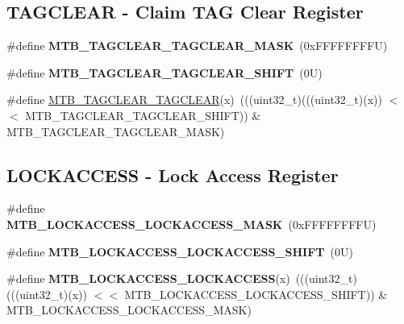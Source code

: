 \subsection*{T\+A\+G\+C\+L\+E\+AR -\/ Claim T\+AG Clear Register}
\begin{DoxyCompactItemize}
\item 
\mbox{\label{group___m_t_b___register___masks_ga50dabf07ab4f88615242b68c0466aab0}} 
\#define {\bfseries M\+T\+B\+\_\+\+T\+A\+G\+C\+L\+E\+A\+R\+\_\+\+T\+A\+G\+C\+L\+E\+A\+R\+\_\+\+M\+A\+SK}~(0x\+F\+F\+F\+F\+F\+F\+F\+F\+U)
\item 
\mbox{\label{group___m_t_b___register___masks_gac1ba97e3448e183a4d00b63060786290}} 
\#define {\bfseries M\+T\+B\+\_\+\+T\+A\+G\+C\+L\+E\+A\+R\+\_\+\+T\+A\+G\+C\+L\+E\+A\+R\+\_\+\+S\+H\+I\+FT}~(0\+U)
\item 
\#define \mbox{\hyperlink{group___m_t_b___register___masks_ga2a3e47e7cacd4d3812c5371fd6d3fa0b}{M\+T\+B\+\_\+\+T\+A\+G\+C\+L\+E\+A\+R\+\_\+\+T\+A\+G\+C\+L\+E\+AR}}(x)~(((uint32\+\_\+t)(((uint32\+\_\+t)(x)) $<$$<$ M\+T\+B\+\_\+\+T\+A\+G\+C\+L\+E\+A\+R\+\_\+\+T\+A\+G\+C\+L\+E\+A\+R\+\_\+\+S\+H\+I\+FT)) \& M\+T\+B\+\_\+\+T\+A\+G\+C\+L\+E\+A\+R\+\_\+\+T\+A\+G\+C\+L\+E\+A\+R\+\_\+\+M\+A\+SK)
\end{DoxyCompactItemize}
\subsection*{L\+O\+C\+K\+A\+C\+C\+E\+SS -\/ Lock Access Register}
\begin{DoxyCompactItemize}
\item 
\mbox{\label{group___m_t_b___register___masks_ga44e6720b612450d08ba896ca1ad61185}} 
\#define {\bfseries M\+T\+B\+\_\+\+L\+O\+C\+K\+A\+C\+C\+E\+S\+S\+\_\+\+L\+O\+C\+K\+A\+C\+C\+E\+S\+S\+\_\+\+M\+A\+SK}~(0x\+F\+F\+F\+F\+F\+F\+F\+F\+U)
\item 
\mbox{\label{group___m_t_b___register___masks_ga7417a26e29a0d9667c59ce74044f210b}} 
\#define {\bfseries M\+T\+B\+\_\+\+L\+O\+C\+K\+A\+C\+C\+E\+S\+S\+\_\+\+L\+O\+C\+K\+A\+C\+C\+E\+S\+S\+\_\+\+S\+H\+I\+FT}~(0\+U)
\item 
\mbox{\label{group___m_t_b___register___masks_ga02368a1bc86c6a5cbc793233ee314147}} 
\#define {\bfseries M\+T\+B\+\_\+\+L\+O\+C\+K\+A\+C\+C\+E\+S\+S\+\_\+\+L\+O\+C\+K\+A\+C\+C\+E\+SS}(x)~(((uint32\+\_\+t)(((uint32\+\_\+t)(x)) $<$$<$ M\+T\+B\+\_\+\+L\+O\+C\+K\+A\+C\+C\+E\+S\+S\+\_\+\+L\+O\+C\+K\+A\+C\+C\+E\+S\+S\+\_\+\+S\+H\+I\+FT)) \& M\+T\+B\+\_\+\+L\+O\+C\+K\+A\+C\+C\+E\+S\+S\+\_\+\+L\+O\+C\+K\+A\+C\+C\+E\+S\+S\+\_\+\+M\+A\+SK)
\end{DoxyCompactItemize}
